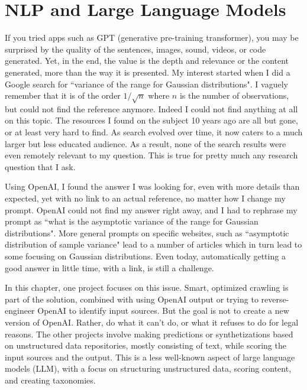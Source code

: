 \documentclass[oneside,10pt]{book}
\begin{document}

\chapter{NLP and Large Language Models}\label{nlpllm}

If you tried apps such as \textcolor{index}{GPT} (generative pre-training transformer), you may be surprised by the quality of the sentences, images, sound, videos, or code generated. Yet, in the end, the value is the depth and relevance or the content generated, more than the way it is presented. My interest started when I did a Google search for ``variance of the range for Gaussian distributions". I vaguely remember that it is of the order $1/\sqrt{n}$ where $n$ is the number of observations, but could not find the reference anymore. Indeed I could not find anything at all on this topic. The resources I found on the subject 10 years ago are all but gone, or at least very hard to find. As search evolved over time, it now caters to a much larger but less educated audience. As a result, none of the search results were even remotely relevant to my question. This is true for pretty much any research question that I ask. 

Using OpenAI, I found the answer I was looking for, even with more details than expected, yet with no link to an actual reference, no matter how I change my prompt. OpenAI could not find my answer right away, and I had to rephrase my prompt as 
``what is the asymptotic variance of the range for Gaussian distributions". More general prompts on specific websites, such as ``asymptotic distribution of sample variance" lead to a number of articles which in turn lead to some focusing on Gaussian distributions. Even today, 
 automatically getting a good answer in little time, with a link, is still a challenge.

In this chapter, one project focuses on this issue. Smart, optimized crawling is part of the solution, combined with using OpenAI output or trying to reverse-engineer OpenAI to identify input sources.
But the goal is not to create a new version of OpenAI. Rather, do what it can't do, or what it refuses to do for legal reasons. The other projects
 involve making predictions or synthetizations based on unstructured data repositories, mostly consisting of text, while scoring the input sources and
 the output. This is a less well-known aspect of large language models (\textcolor{index}{LLM}), with a focus on structuring 
\textcolor{index}{unstructured data}, scoring content, and creating \textcolor{index}{taxonomies}.
\end{document}
